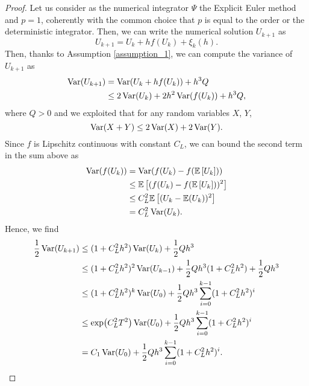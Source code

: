 \begin{proof} Let us consider as the numerical integrator $\Psi$ the Explicit Euler method and $p = 1$, coherently with the common choice that $p$ is equal to the order or the deterministic integrator. Then, we can write the numerical solution $U_{k+1}$ as
\begin{equation}
	U_{k+1} = U_k + hf(U_k) + \xi_k(h).
\end{equation}
Then, thanks to Assumption \ref{assumption_1}, we can compute the variance of $U_{k+1}$ as 
\begin{equation}\label{eq:indepProof}
	\begin{aligned}
		\operatorname{Var}(U_{k+1}) &= \operatorname{Var}(U_k + hf(U_k)) + h^3Q \\
		&\leq 2\operatorname{Var}(U_k) + 2h^2 \operatorname{Var}(f(U_k)) + h^3Q,
	\end{aligned}
\end{equation}
where $Q > 0$ and we exploited that for any random variables $X$, $Y$,
\begin{equation}\label{eq:varProp}
	\operatorname{Var}(X + Y) \leq 2\operatorname{Var}(X) + 2\operatorname{Var}(Y).
\end{equation}
Since $f$ is Lipschitz continuous with constant $C_L$, we can bound the second term in the sum above as
\begin{equation}\label{eq:lipschitzVar}
	\begin{aligned}
		\operatorname{Var}(f(U_k)) &= \operatorname{Var}(f(U_k) - f(\mathbb{E}\left[U_k\right])) \\
		&\leq \mathbb{E}\left[(f(U_k) - f(\mathbb{E}\left[U_k\right]))^2\right] \\
		&\leq C_L^2\mathbb{E}\left[(U_k - \mathbb{E}(U_k))^2\right] \\
		&= C_L^2 \operatorname{Var}(U_k).
	\end{aligned}
\end{equation}
Hence, we find
\begin{equation}
\begin{aligned}
	\frac{1}{2}\Var(U_{k+1}) &\leq (1 + C_L^2h^2)\Var(U_k) + \frac{1}{2}Q h^3 \\
	&\leq (1 + C_L^2h^2)^2 \Var(U_{k-1}) + \frac{1}{2}Q h^3 (1 + C_L^2h^2) + \frac{1}{2}Q h^3 \\
	&\leq (1 + C_L^2h^2)^k \Var(U_0) + \frac{1}{2}Q h^3 \sum_{i = 0}^{k - 1}(1 + C_L^2h^2)^i \\
	&\leq \exp(C_L^2T^2) \Var(U_0) + \frac{1}{2}Q h^3 \sum_{i = 0}^{k - 1}(1 + C_L^2h^2)^i \\
	&= C_1 \Var(U_0) + \frac{1}{2}Q h^3 \sum_{i = 0}^{k - 1}(1 + C_L^2h^2)^i. \\
\end{aligned}

\end{equation}
\end{proof}
